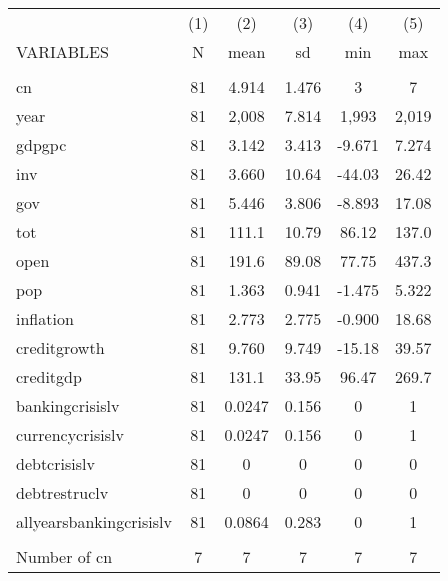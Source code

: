 \documentclass[]{article}
\begin{document}
\begin{tabular}{lccccc} \hline
 & (1) & (2) & (3) & (4) & (5) \\
VARIABLES & N & mean & sd & min & max \\ \hline
 &  &  &  &  &  \\
cn & 81 & 4.914 & 1.476 & 3 & 7 \\
year & 81 & 2,008 & 7.814 & 1,993 & 2,019 \\
gdpgpc & 81 & 3.142 & 3.413 & -9.671 & 7.274 \\
inv & 81 & 3.660 & 10.64 & -44.03 & 26.42 \\
gov & 81 & 5.446 & 3.806 & -8.893 & 17.08 \\
tot & 81 & 111.1 & 10.79 & 86.12 & 137.0 \\
open & 81 & 191.6 & 89.08 & 77.75 & 437.3 \\
pop & 81 & 1.363 & 0.941 & -1.475 & 5.322 \\
inflation & 81 & 2.773 & 2.775 & -0.900 & 18.68 \\
creditgrowth & 81 & 9.760 & 9.749 & -15.18 & 39.57 \\
creditgdp & 81 & 131.1 & 33.95 & 96.47 & 269.7 \\
bankingcrisislv & 81 & 0.0247 & 0.156 & 0 & 1 \\
currencycrisislv & 81 & 0.0247 & 0.156 & 0 & 1 \\
debtcrisislv & 81 & 0 & 0 & 0 & 0 \\
debtrestruclv & 81 & 0 & 0 & 0 & 0 \\
allyearsbankingcrisislv & 81 & 0.0864 & 0.283 & 0 & 1 \\
 &  &  &  &  &  \\
 Number of cn & 7 & 7 & 7 & 7 & 7 \\ \hline
\end{tabular}
\end{document}
